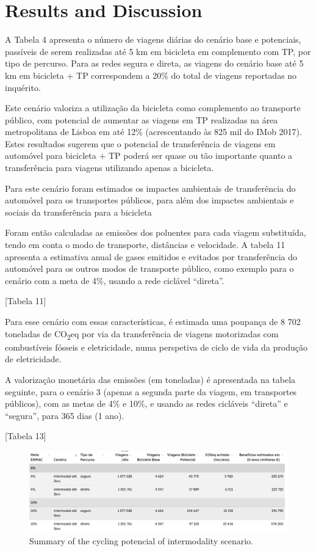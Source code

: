 \documentclass[runningheads]{llncs}
\begin{document}
\hypertarget{results-and-discussion}{%
\section{Results and Discussion}\label{results-and-discussion}}

A Tabela 4 apresenta o número de viagens diárias do cenário base e
potenciais, passíveis de serem realizadas até 5 km em bicicleta em
complemento com TP, por tipo de percurso. Para as redes segura e direta,
as viagens do cenário base até 5 km em bicicleta + TP correspondem a
20\% do total de viagens reportadas no inquérito.

Este cenário valoriza a utilização da bicicleta como complemento ao
transporte público, com potencial de aumentar as viagens em TP
realizadas na área metropolitana de Lisboa em até 12\% (acrescentando às
825 mil do IMob 2017). Estes resultados sugerem que o potencial de
transferência de viagens em automóvel para bicicleta + TP poderá ser
quase ou tão importante quanto a transferência para viagens utilizando
apenas a bicicleta.

Para este cenário foram estimados os impactes ambientais de
transferência do automóvel para os transportes públicos, para além dos
impactes ambientais e sociais da transferência para a bicicleta

Foram então calculadas as emissões dos poluentes para cada viagem
substituída, tendo em conta o modo de transporte, distâncias e
velocidade. A tabela 11 apresenta a estimativa anual de gases emitidos e
evitados por transferência do automóvel para os outros modos de
transporte público, como exemplo para o cenário com a meta de 4\%,
usando a rede ciclável ``direta''.

{[}Tabela 11{]}

Para esse cenário com essas características, é estimada uma poupança de
8 702 toneladas de CO\textsubscript{2}eq por via da transferência de
viagens motorizadas com combustíveis fósseis e eletricidade, numa
perspetiva de ciclo de vida da produção de eletricidade.

A valorização monetária das emissões (em toneladas) é apresentada na
tabela seguinte, para o cenário 3 (apenas a segunda parte da viagem, em
transportes públicos), com as metas de 4\% e 10\%, e usando as redes
cicláveis ``direta'' e ``segura'', para 365 dias (1 ano).

{[}Tabela 13{]}

\begin{figure}
\includegraphics[width=1\linewidth,]{img/table1} \caption{Summary of the cycling potencial of intermodality scenario.}\label{fig:summary1}
\end{figure}
\end{document}
